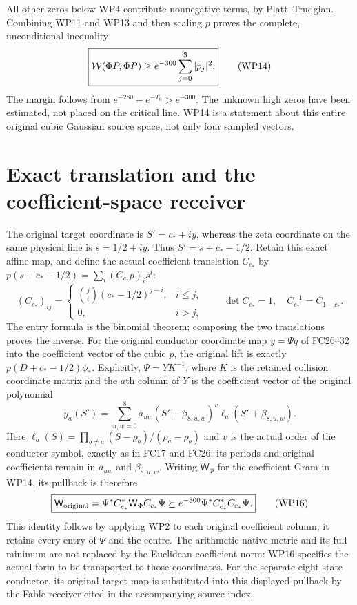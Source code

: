 All other zeros below WP4 contribute nonnegative terms, by
Platt--Trudgian. Combining WP11 and WP13 and then scaling $p$
proves the complete, unconditional inequality
\[
 \boxed{\mathcal W(\Phi P,\Phi P)\ge e^{-300}\sum_{j=0}^3|p_j|^2.}
                                                                  \tag{WP14}
\]
The margin follows from $e^{-280}-e^{-T_0}>e^{-300}$.
The unknown high zeros have been estimated, not placed on the
critical line. WP14 is a statement about this entire original
cubic Gaussian source space, not only four sampled vectors.

\section{Exact translation and the coefficient-space receiver}
The original target coordinate is $S'=c_*+iy$, whereas the
zeta coordinate on the same physical line is $s=1/2+iy$.
Thus $S'=s+c_*-1/2$. Retain this exact affine map, and define
the actual coefficient translation $C_{c_*}$ by
$p(s+c_*-1/2)=\sum_i(C_{c_*}p)_i s^i$:
\[
 (C_{c_*})_{ij}=\begin{cases}\binom ji(c_*-1/2)^{j-i},&i\le j,\\
                  0,&i>j,\end{cases}\qquad
 \det C_{c_*}=1,\quad C_{c_*}^{-1}=C_{1-c_*}.                \tag{WP15}
\]
The entry formula is the binomial theorem; composing the two
translations proves the inverse. For the original conductor
coordinate map $y=\Psi q$ of FC26--32 \cite{swcert:FC} into the coefficient vector of the
cubic $p$, the original lift is exactly $p(D+c_*-1/2)\phi_*$.
Explicitly, $\Psi=YK^{-1}$, where $K$ is the retained collision
coordinate matrix and the $a$th column of $Y$ is the coefficient
vector of the original polynomial
\[
 y_a(S')=\sum_{u,w=0}^{8}a_{uw}
          (S'+\beta_{8,u,w})^v\ell_a(S'+\beta_{8,u,w}).
\]
Here $\ell_a(S)=\prod_{b\ne a}(S-\rho_b)/(\rho_a-\rho_b)$
and $v$ is the actual order of the conductor symbol, exactly as
in FC17 and FC26; its periods and original coefficients remain
in $a_{uw}$ and $\beta_{8,u,w}$.
Writing $\mathsf W_\Phi$ for the coefficient Gram in WP14,
its pullback is therefore
\[
 \boxed{\mathsf W_{\rm original}
  =\Psi^*C_{c_*}^*\mathsf W_\Phi C_{c_*}\Psi
  \succeq e^{-300}\Psi^*C_{c_*}^*C_{c_*}\Psi.}              \tag{WP16}
\]
This identity follows by applying WP2 to each original
coefficient column; it retains every entry of $\Psi$ and the
centre. The arithmetic native metric and its full minimum are
not replaced by the Euclidean coefficient norm: WP16 specifies
the actual form to be transported to those coordinates.
For the separate eight-state conductor, its original target map
is substituted into this displayed pullback by the Fable
receiver cited in the accompanying source index.

